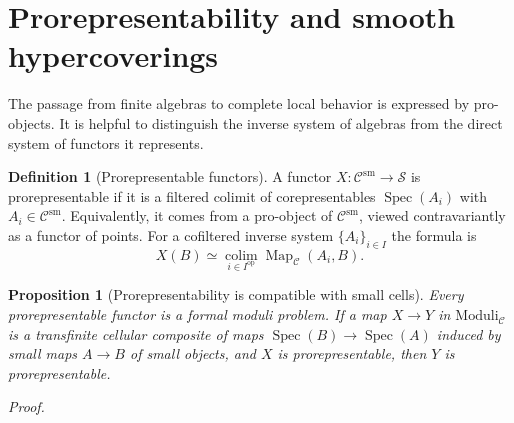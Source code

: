\documentclass[12pt,letterpaper,oneside]{report}
\newtheorem{proposition}[theorem]{Proposition}
\theoremstyle{definition}
\newtheorem{definition}[theorem]{Definition}
\theoremstyle{remark}
\renewenvironment{proof}[1][Proof]{\par\nopagebreak[4]\addvspace{4pt}\noindent\textit{#1.}\par\nobreak\vspace{0.5\baselineskip}}{\par\addvspace{4pt}}
\newcommand{\cS}{\mathcal S}
\newcommand{\cC}{\mathcal C}
\newcommand{\FMP}{\mathrm{Moduli}}
\newcommand{\Map}{\operatorname{Map}}
\newcommand{\Spec}{\operatorname{Spec}}
\newcommand{\colim}{\operatorname*{colim}}
\newcommand{\op}{\mathrm{op}}
\newcommand{\sm}{\mathrm{sm}}
\begin{document}
\section{Prorepresentability and smooth hypercoverings}
\label{sec:hypercovers}

The passage from finite algebras to complete local behavior is expressed by pro-objects. It is helpful to distinguish the inverse system of algebras from the direct system of functors it represents.

\begin{definition}[Prorepresentable functors]
A functor $X:\cC^{\sm}\to\cS$ is prorepresentable if it is a filtered colimit of corepresentables $\Spec(A_i)$ with $A_i\in\cC^{\sm}$. Equivalently, it comes from a pro-object of $\cC^{\sm}$, viewed contravariantly as a functor of points. For a cofiltered inverse system $\{A_i\}_{i\in I}$ the formula is
\[
 X(B)\simeq\colim_{i\in I^{\op}}\Map_{\cC}(A_i,B).
\]
\end{definition}

\begin{proposition}[Prorepresentability is compatible with small cells]
\label{prop:pro-cells}
Every prorepresentable functor is a formal moduli problem. If a map $X\to Y$ in $\FMP_{\cC}$ is a transfinite cellular composite of maps $\Spec(B)\to\Spec(A)$ induced by small maps $A\to B$ of small objects, and $X$ is prorepresentable, then $Y$ is prorepresentable.
\end{proposition}
\begin{proof}
\end{proof}



\end{document}

